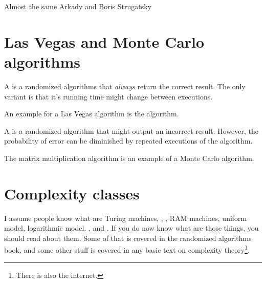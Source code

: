 %




\ChapterPrefix{}
\ChapterGen{}

%
{Almost the same}%
{Arkady and Boris Strugatsky}



\section{Las Vegas and Monte Carlo algorithms}

\begin{defn}
    A  is a
    randomized algorithms that {\em always} return the correct result.
    The only variant is that it's running time might change between
    executions.
\end{defn}

An example for a Las Vegas algorithm is the 
algorithm.

\begin{defn}
    A 
    is a randomized algorithm that might output an incorrect result.
    However, the probability of error can be diminished by repeated
    executions of the algorithm.
\end{defn}

The matrix multiplication algorithm is an example of a Monte Carlo
algorithm.

\section{Complexity classes}

I assume people know what are Turing machines, ,
, RAM machines, uniform model, logarithmic model.
, and . If you do now know what are those
things, you should read about them. Some of that is covered in the
randomized algorithms book, and some other stuff is covered in any
basic text on complexity theory\footnote{There is also the internet.}.


